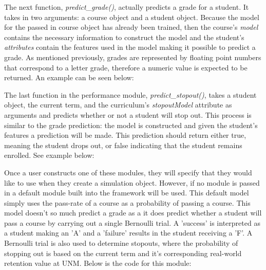 \documentclass[botnum, fleqn]{unmeethesis}
\begin{document}
    

    The next function, \textit{predict\_grade()}, actually predicts a grade for a student. It takes in two arguments: a course object and a student object. Because the model for the passed in course object has already been trained, then the course's \textit{model} contains the necessary information to construct the model and the student's \textit{attributes} contain the features used in the model making it possible to predict a grade. As mentioned previously, grades are represented by floating point numbers that correspond to a letter grade, therefore a numeric value is expected to be returned. An example can be seen below:

    

    The last function in the performance module, \textit{predict\_stopout()}, takes a student object, the current term, and the curriculum's \textit{stopoutModel} attribute as arguments and predicts whether or not a student will stop out. This process is similar to the grade prediction: the model is constructed and given the student's features a prediction will be made. This prediction should return either true, meaning the student drops out, or false indicating that the student remains enrolled. See example below:

    

    Once a user constructs one of these modules, they will specify that they would like to use when they create a simulation object. However, if no module is passed in a default module built into the framework will be used. This default model simply uses the pass-rate of a course as a probability of passing a course. This model doesn't so much predict a grade as a it does predict whether a student will pass a course by carrying out a single Bernoulli trial. A 'success' is interpreted as a student making an 'A' and a 'failure' results in the student receiving a 'F'. A Bernoulli trial is also used to determine stopouts, where the probability of stopping out is based on the current term and it's corresponding real-world retention value at UNM. Below is the code for this module:

    
\end{document}
